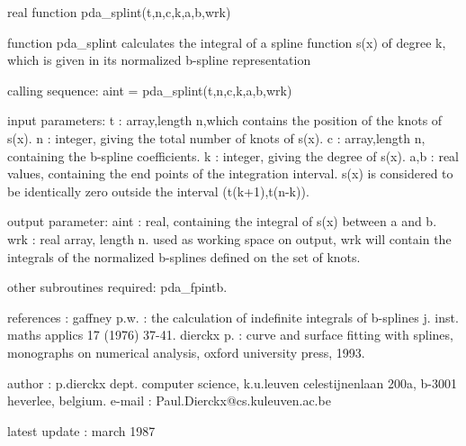 \documentclass[11pt,twoside,nolof]{starlink}
\begin{document}
\begin{terminalv}
      real function pda_splint(t,n,c,k,a,b,wrk)


  function pda_splint calculates the integral of a spline function s(x)
  of degree k, which is given in its normalized b-spline representation

  calling sequence:
     aint = pda_splint(t,n,c,k,a,b,wrk)

  input parameters:
    t    : array,length n,which contains the position of the knots
           of s(x).
    n    : integer, giving the total number of knots of s(x).
    c    : array,length n, containing the b-spline coefficients.
    k    : integer, giving the degree of s(x).
    a,b  : real values, containing the end points of the integration
           interval. s(x) is considered to be identically zero outside
           the interval (t(k+1),t(n-k)).

  output parameter:
    aint : real, containing the integral of s(x) between a and b.
    wrk  : real array, length n.  used as working space
           on output, wrk will contain the integrals of the normalized
           b-splines defined on the set of knots.

  other subroutines required: pda_fpintb.

  references :
    gaffney p.w. : the calculation of indefinite integrals of b-splines
                   j. inst. maths applics 17 (1976) 37-41.
    dierckx p. : curve and surface fitting with splines, monographs on
                 numerical analysis, oxford university press, 1993.

  author :
    p.dierckx
    dept. computer science, k.u.leuven
    celestijnenlaan 200a, b-3001 heverlee, belgium.
    e-mail : Paul.Dierckx@cs.kuleuven.ac.be

  latest update : march 1987
\end{terminalv}


\end{document}
